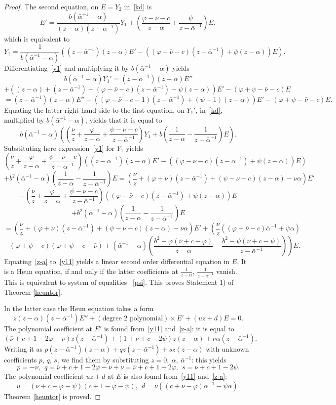 \documentclass[preprint,12pt]{elsarticle}
\theoremstyle{plain}
\renewcommand{\phi}{\varphi}
\def\a{\alpha}
\def\ba{\bar\alpha}
\def\bam{\ba^{-1}}
\numberwithin{equation}{section}
\numberwithin{equation}{section}
\begin{document}
\begin{proof}  The second equation, on $E=Y_2$ in~\eqref{kd} is 
$$E'=\frac{b(\bam-\a)}{(z-\a)(z-\bam)}Y_1+
\left(\frac{\phi-\bar\nu-c}{z-\a}+\frac\psi{z-\bam}\right)E,$$
which is equivalent to 
\begin{equation}Y_1=\frac1{ b(\bam-\a)}\left((z-\bam)(z-\a)E'-((\phi-\bar\nu-c)(z-\bam)+\psi(z-\a))E\right). 
\label{y1}\end{equation}
Differentiating~\eqref{y1} and multiplying it by $ b(\bam-\a)$ yields
$$ b(\bam-\a)Y_1'=(z-\bam)(z-\a)E''$$
$$+((z-\a)+(z-\bam)-(\phi-\bar\nu-c)(z-\bam)-\psi(z-\a))E'-(\phi+\psi-\bar\nu-c)E$$
\begin{equation}=(z-\bam)(z-\a)E''-((\phi-\bar\nu-c-1)(z-\bam)+(\psi-1)(z-\a))E'-(\phi+\psi-\bar\nu-c)E. \label{y11}\end{equation}
Equating the latter right-hand side to 
the first equation, on $Y_1'$, in~\eqref{kd}, multiplied by $ b(\bam-\a)$, yields 
that it is equal to 
$$ b(\bam-\a)\left(\left(\frac{\nu}z+\frac{\phi}{z-\a}+\frac{\psi-\nu-c}{z-\bam}\right)Y_1+
b\left(\frac1{z-\a}-\frac1{z-\bam}\right)E\right).$$
Substituting here expression~\eqref{y1} for $Y_1$ yields 
$$\left(\frac{\nu}z+\frac{\phi}{z-\a}+\frac{\psi-\nu-c}{z-\bam}\right)\left((z-\bam)(z-\a)E'-((\phi-\bar\nu-c)(z-\bam)+\psi(z-\a))E\right)$$
$$+ b^2(\bam-\a)\left(\frac1{z-\a}-\frac1{z-\bam}\right)E=\left(\frac{\nu}z+(\phi+\nu)(z-\bam)+
(\psi-\nu-c)(z-\a)-\nu\a\right)E'$$
$$-\left(\frac{\nu}z+\frac{\phi}{z-\a}+\frac{\psi-\nu-c}{z-\bam}\right)((\phi-\bar\nu-c)(z-\bam)+\psi(z-\a))E$$
$$+ b^2(\bam-\a)\left(\frac1{z-\a}-\frac1{z-\bam}\right)E$$
$$=\left(\frac{\nu}z+(\phi+\nu)(z-\bam)+
(\psi-\nu-c)(z-\a)-\nu\a\right)E'
+\left(\frac{\nu}z((\phi-\bar\nu-c)\bam+\psi\a)\right.$$
\begin{equation}\left.-(\phi+\psi-c)(\phi+\psi-c-\bar\nu)+(\bam-\a)\left(\frac{ b^2-\phi(\bar\nu+c-\phi)}
{z-\a}-\frac{ b^2-\psi(\nu+c-\psi)}{z-\bam}\right)\right)E.\label{z-a}\end{equation}
Equating~\eqref{z-a} to~\eqref{y11} yields a linear second order differential equation in $E$. It is a Heun equation, 
if and only if the latter coefficients at $\frac1{z-\a}$, $\frac1{z-\bam}$ vanish. This is equivalent to system of equalities 
~\eqref{psi}. This proves Statement 1) of Theorem \ref{heuntor}.

In the latter case the Heun equation takes a form 
$$z(z-\a)(z-\bam)E''+(\text{degree 2 polynomial})\times E'+(uz+d)E=0.$$
The polynomial coefficient at $E'$ is found from~\eqref{y11} and~\eqref{z-a}: it is equal to 
$$(\bar\nu+c+1-2\phi-\nu)z(z-\bam)+(1+\nu+c-2\psi)z(z-\a)+\nu\alpha(z-\bam).$$
Writing it as $p(z-\bam)(z-\a)+qz(z-\bam)+sz(z-\a)$ with unknown coefficients $p$, $q$, $s$, we find them 
by substituting $z=0,\ \a, \ \bam$: this yields
$$p=-\nu, \ \ q=\bar\nu+c+1-2\phi-\nu+\nu=\bar\nu+c+1-2\phi, \ \ s=\nu+c+1-2\psi.$$
The polynomial coefficient $uz+d$ at $E$ is also found from~\eqref{y11} and~\eqref{z-a}:
$$u=(\bar\nu+c-\phi-\psi)(c+1-\phi-\psi), \ \ d=\nu((c+\bar\nu-\phi)\bam-\psi\a).$$
Theorem \ref{heuntor} is proved.
\end{proof}
\end{document}
